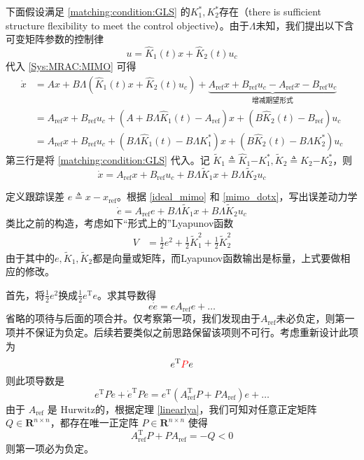 下面假设满足 \eqref{matching:condition:GLS} 的$K^{\ast}_1, K^{\ast}_2$存在（there is sufficient structure flexibility to meet the control
objective）。由于$\Lambda$未知，我们提出以下含可变矩阵参数的控制律
\[ u = \hat{K}_1 (t) x + \hat{K}_2 (t) u_c \]
代入 \eqref{Sys:MRAC:MIMO} 可得
\begin{align}
    \dot{x}&=A  x + B \Lambda (\hat{K}_1 (t) x + \hat{K}_2 (t) u_c)+
    \underbrace{A_{\ensuremath{\operatorname{ref}}} x +
    B_{\ensuremath{\operatorname{ref}}} u_c-A_{\ensuremath{\operatorname{ref}}} x -
    B_{\ensuremath{\operatorname{ref}}} u_c}_{\text{增减期望形式}}\nonumber\\
    &=A_{\ensuremath{\operatorname{ref}}} x +
    B_{\ensuremath{\operatorname{ref}}} u_c+(A + B \Lambda \hat{K}_1 (t)-A_{\ensuremath{\operatorname{ref}}}) x+(B\hat{K}_2 (t)-B_{\ensuremath{\operatorname{ref}}}) u_c\nonumber\\
    &=A_{\ensuremath{\operatorname{ref}}} x +
    B_{\ensuremath{\operatorname{ref}}} u_c+(B \Lambda \hat{K}_1 (t)-B \Lambda K^{\ast}_1) x+(B\hat{K}_2 (t)-B \Lambda K^{\ast}_2) u_c\label{mimo_dotx}
\end{align}
第三行是将 \eqref{matching:condition:GLS} 代入。记 $\tilde{K}_1 \triangleq \hat{K}_1 {- K_1^{\ast}} , \tilde{K}_2
\triangleq \hat{K}_2 {- K_2^{\ast}} $，则
\[ \dot{x} = A_{\ensuremath{\operatorname{ref}}}  x +
   B_{\ensuremath{\operatorname{ref}}} u_c + B \Lambda  \tilde{K}_1 x + B
   \Lambda  \tilde{K}_2 u_c \]

定义跟踪误差 $e \triangleq x -
x_{\ensuremath{\operatorname{ref}}}$。根据 \eqref{ideal_mimo} 和 \eqref{mimo_dotx}，写出误差动力学
\begin{equation}
  \dot{e} = A_{\ensuremath{\operatorname{ref}}} e + B \Lambda  \tilde{K}_1 x +
  B \Lambda  \tilde{K}_2 u_c \label{errsys:MRAC:GLS}
\end{equation}
类比之前的构造，考虑如下“形式上的”Lyapunov函数
\begin{align*}
  V&=\frac12e^2+\frac{1}{2}\tilde{K}_1^2+\frac{1}{2}\tilde{K}_2^2
\end{align*}
由于其中的$e,\tilde{K}_1,\tilde{K}_2$都是向量或矩阵，而Lyapunov函数输出是标量，上式要做相应的修改。

首先，将$\frac12e^2$换成$\frac12e^\mathrm{T}e$。求其导数得\[e\dot{e}=eA_{\ensuremath{\operatorname{ref}}} e+\dots\]
省略的项待与后面的项合并。仅考察第一项，我们发现由于$A_{\ensuremath{\operatorname{ref}}}$未必负定，则第一项并不保证为负定。后续若要类似之前思路保留该项则不可行。考虑重新设计此项为\[e^\mathrm{T}\textcolor{red}{P}e\]
则此项导数是
\[e^\mathrm{T}P\dot{e}+\dot{e}^\mathrm{T}Pe=e^\mathrm{T}(A_{\ensuremath{\operatorname{ref}}}^\mathrm{T} P + P A_{\ensuremath{\operatorname{ref}}}) e+\dots\]
由于 $A_{\ensuremath{\operatorname{ref}}}$ 是 Hurwitz的，根据定理 \ref{linearlya}，我们可知对任意正定矩阵 $Q \in \mathbf{R}^{n \times
n}$，都存在唯一正定阵 $P \in \mathbf{R}^{n \times n}$
使得
\[ A_{\ensuremath{\operatorname{ref}}}^\mathrm{T} P + P 
   A_{\ensuremath{\operatorname{ref}}} = - Q < 0 \]
则第一项必为负定。

